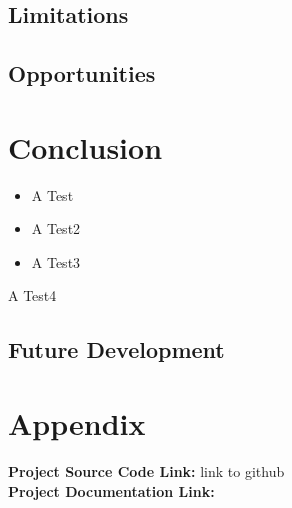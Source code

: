 \section{Limitations}

\section{Opportunities}

\chapter{Conclusion}


\begin{itemize}
\item A Test

\item A Test2
\item A Test3
\end{itemize}
A Test4
\section{Future Development}

\chapter{Appendix}

\textbf{Project Source Code Link: }link to github \\
\textbf{Project Documentation Link: } \\

